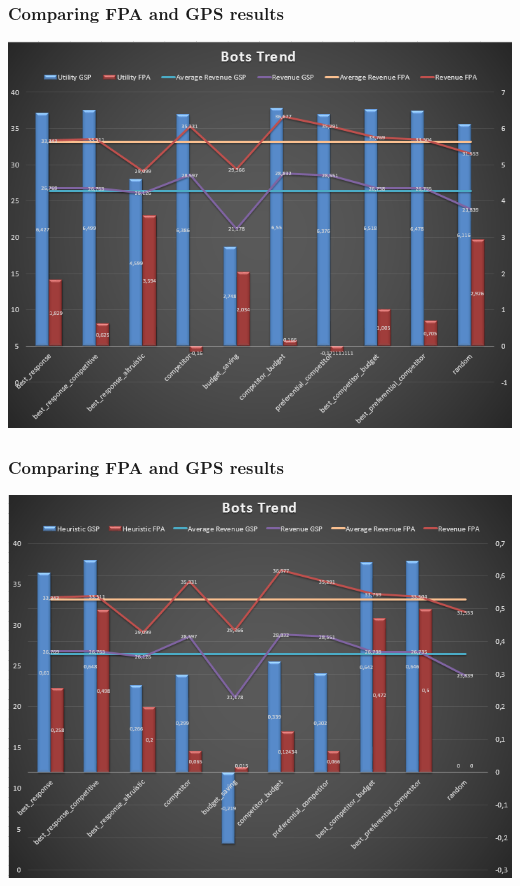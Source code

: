 \documentclass{beamer}
\begin{document}
\begin{frame}
\frametitle{Comparing FPA and GPS results}
\begin{center}
\includegraphics[scale=0.46]{img/Auctions/Combined_Utility.PNG} 
\end{center}
\end{frame}

\begin{frame}
\frametitle{Comparing FPA and GPS results}
\begin{center}
\includegraphics[scale=0.46]{img/Auctions/Combined_Heuristic.PNG} 
\end{center}
\end{frame}
\end{document}
